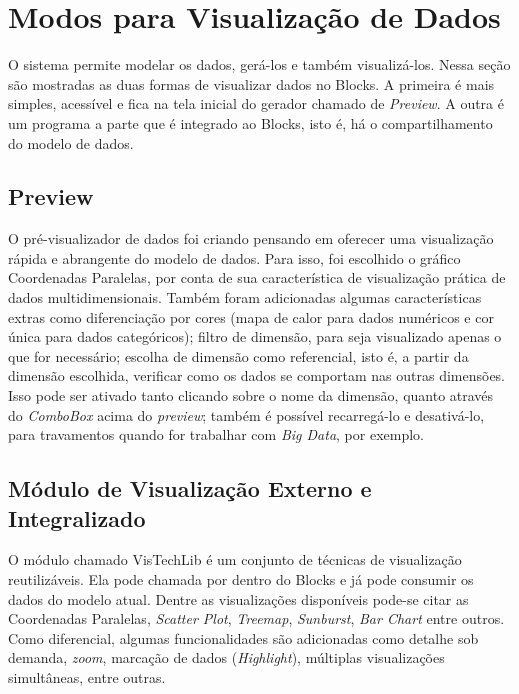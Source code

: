 \documentclass[
	12pt,				%
	openright,			%
	twoside,			%
	a4paper,			%
	english,			%
	brazil				%
	]{abntex2}
\begin{document}
	\section{Modos para Visualização de Dados}
		O sistema permite modelar os dados, gerá-los e também visualizá-los.
		Nessa seção são mostradas as duas formas de visualizar dados no Blocks.
		A primeira é mais simples, acessível e fica na tela inicial do gerador chamado de \emph{Preview}.
		A outra é um programa a parte que é integrado ao Blocks, isto é, há o compartilhamento do modelo de dados.

		\subsection{Preview}
			O pré-visualizador de dados foi criando pensando em oferecer uma visualização rápida e abrangente do modelo de dados.
			Para isso, foi escolhido o gráfico Coordenadas Paralelas, por conta de sua característica de visualização prática de dados multidimensionais.
			Também foram adicionadas algumas características extras como diferenciação por cores (mapa de calor para dados numéricos e cor única para dados categóricos); 
				filtro de dimensão, para seja visualizado apenas o que for necessário;
				escolha de dimensão como referencial, isto é, a partir da dimensão escolhida, verificar como os dados se comportam nas outras dimensões. Isso pode ser ativado tanto clicando sobre o nome da dimensão, quanto através do \emph{ComboBox} acima do \emph{preview};
				também é possível recarregá-lo e desativá-lo, para travamentos quando for trabalhar com \emph{Big Data}, por exemplo.

		\subsection{Módulo de Visualização Externo e Integralizado}
			O módulo chamado VisTechLib é um conjunto de técnicas de visualização reutilizáveis.
			Ela pode chamada por dentro do Blocks e já pode consumir os dados do modelo atual.
			Dentre as visualizações disponíveis pode-se citar as Coordenadas Paralelas, \emph{Scatter Plot}, \emph{Treemap}, \emph{Sunburst}, \emph{Bar Chart} entre outros.
			Como diferencial, algumas funcionalidades são adicionadas como detalhe sob demanda, \emph{zoom}, marcação de dados (\emph{Highlight}), múltiplas visualizações simultâneas, entre outras.
	
\end{document}
